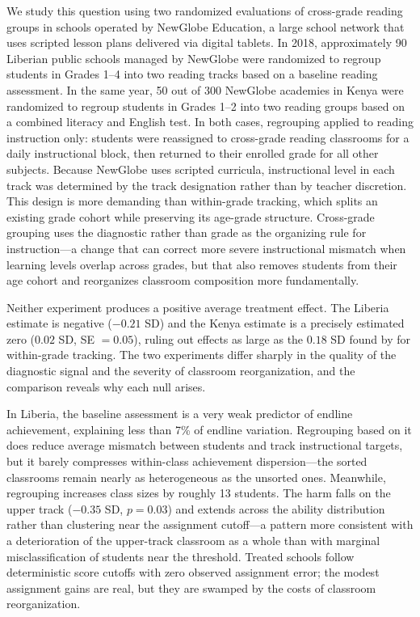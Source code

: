 \documentclass[11pt]{article}
\begin{document}
We study this question using two randomized evaluations of cross-grade reading groups in schools operated by NewGlobe Education, a large school network that uses scripted lesson plans delivered via digital tablets. In 2018, approximately 90 Liberian public schools managed by NewGlobe were randomized to regroup students in Grades 1--4 into two reading tracks based on a baseline reading assessment. In the same year, 50 out of 300 NewGlobe academies in Kenya were randomized to regroup students in Grades 1--2 into two reading groups based on a combined literacy and English test. In both cases, regrouping applied to reading instruction only: students were reassigned to cross-grade reading classrooms for a daily instructional block, then returned to their enrolled grade for all other subjects. Because NewGlobe uses scripted curricula, instructional level in each track was determined by the track designation rather than by teacher discretion. This design is more demanding than within-grade tracking, which splits an existing grade cohort while preserving its age-grade structure. Cross-grade grouping uses the diagnostic rather than grade as the organizing rule for instruction---a change that can correct more severe instructional mismatch when learning levels overlap across grades, but that also removes students from their age cohort and reorganizes classroom composition more fundamentally.

Neither experiment produces a positive average treatment effect. The Liberia estimate is negative ($-0.21$ SD) and the Kenya estimate is a precisely estimated zero ($0.02$ SD, SE $= 0.05$), ruling out effects as large as the $0.18$ SD found by \citet{duflo2011peer} for within-grade tracking. The two experiments differ sharply in the quality of the diagnostic signal and the severity of classroom reorganization, and the comparison reveals why each null arises.

In Liberia, the baseline assessment is a very weak predictor of endline achievement, explaining less than 7\% of endline variation. Regrouping based on it does reduce average mismatch between students and track instructional targets, but it barely compresses within-class achievement dispersion---the sorted classrooms remain nearly as heterogeneous as the unsorted ones. Meanwhile, regrouping increases class sizes by roughly 13 students. The harm falls on the upper track ($-0.35$ SD, $p = 0.03$) and extends across the ability distribution rather than clustering near the assignment cutoff---a pattern more consistent with a deterioration of the upper-track classroom as a whole than with marginal misclassification of students near the threshold. Treated schools follow deterministic score cutoffs with zero observed assignment error; the modest assignment gains are real, but they are swamped by the costs of classroom reorganization.
\end{document}
